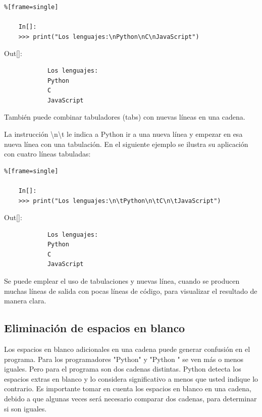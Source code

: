\begin{lstlisting}%[frame=single]
	
	In[]:
	>>> print("Los lenguajes:\nPython\nC\nJavaScript")	 	
\end{lstlisting}

{\ttfamily\scriptsize\scriptsize 
	\hspace{-0.65cm}Out[]:\vspace{-0.15cm}	
	{\color{blue} 	
		\begin{verbatim}		
			Los lenguajes:
			Python
			C
			JavaScript
		\end{verbatim}
}} 
\noindent También puede combinar  tabuladores (tabs)  con nuevas líneas en una cadena. 

La instrucción  {\ttfamily \textbackslash n\textbackslash t} le indica a Python ir a una nueva línea y empezar en esa nueva línea con una tabulación. En el siguiente ejemplo se ilustra su aplicación con cuatro líneas tabuladas:

\begin{lstlisting}%[frame=single]
	
	In[]:
	>>> print("Los lenguajes:\n\tPython\n\tC\n\tJavaScript") 	
\end{lstlisting}

{\ttfamily\scriptsize\scriptsize 
	\hspace{-0.65cm}Out[]:\vspace{-0.15cm}	
	{\color{blue} 	
		\begin{verbatim}		
			Los lenguajes:
			Python
			C
			JavaScript
		\end{verbatim}
}} 


\noindent Se puede emplear el uso de tabulaciones y nuevas línea, cuando se producen muchas líneas de salida con pocas líneas de código, para visualizar el resultado de manera clara.


\subsection{Eliminación de espacios en blanco}\label{espacio_Blanco}  

Los espacios en blanco  adicionales en una cadena puede generar confusión en el programa. Para los programadores  {\ttfamily "Python{}"{}} y {\ttfamily "Python {}"{}} se ven más o menos iguales. Pero para el programa son dos cadenas distintas. Python detecta los espacios extras en blanco y lo considera significativo a menos que usted indique lo contrario.  Es importante tomar en cuenta los espacios en blanco en una cadena, debido a que algunas veces será necesario comparar dos cadenas, para determinar si son iguales.  

